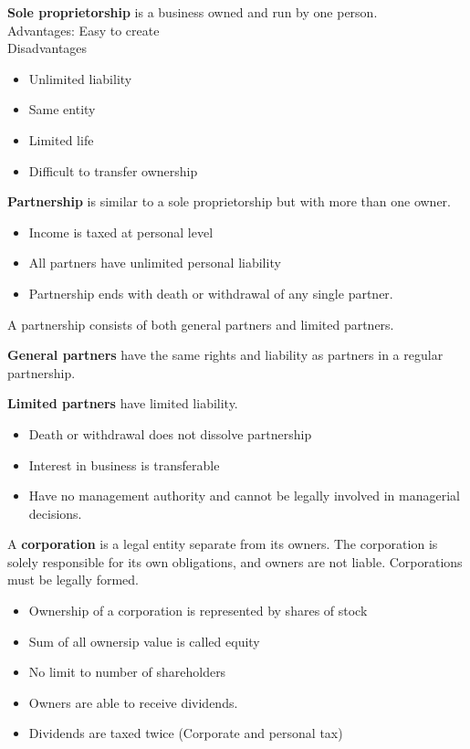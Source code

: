 \documentclass[english, 12pt]{article}
\begin{document}
\begin{defn}
\textbf{Sole proprietorship} is a business owned and run by one person.\\
Advantages: Easy to create\\
Disadvantages
\begin{itemize}
\item Unlimited liability
\item Same entity
\item Limited life
\item Difficult to transfer ownership
\end{itemize}
\end{defn}
\begin{defn}
\textbf{Partnership} is similar to a sole proprietorship but with more than one owner.\\
\begin{itemize}
\item Income is taxed at personal level
\item All partners have unlimited personal liability
\item Partnership ends with death or withdrawal of any single partner.
\end{itemize}
\end{defn}
\begin{qte}
A partnership consists of both general partners and limited partners.
\end{qte}
\begin{defn}
\textbf{General partners} have the same rights and liability as partners in a regular partnership.
\end{defn}
\begin{defn}
\textbf{Limited partners} have limited liability.
\begin{itemize}
\item Death or withdrawal does not dissolve partnership
\item Interest in business is transferable
\item Have no management authority and cannot be legally involved in managerial decisions.
\end{itemize}
\end{defn}
\begin{defn}
A \textbf{corporation} is a legal entity separate from its owners. The corporation is solely responsible for its own obligations, and owners are not liable. Corporations must be legally formed. 
\begin{itemize}
\item Ownership of a corporation is represented by shares of stock
\item Sum of all ownersip value is called equity
\item No limit to number of shareholders
\item Owners are able to receive dividends.
\item Dividends are taxed twice (Corporate and personal tax)
\end{itemize}
\end{defn}
\end{document}

